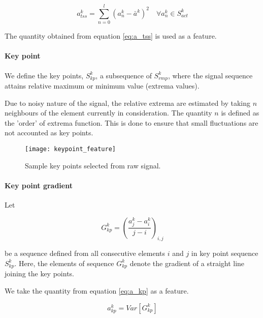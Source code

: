 \documentclass[
10pt,           %
a4paper,        %
oneside,        %
headinclude,footinclude, %
]{scrartcl}
\begin{document}
\begin{equation} \label{eq:a_tss}
a_{tss}^k = \sum_{n=0}^{l}(a^k_n - \bar{a}^k)^2 \quad \forall a^k_n \in S^k_{act}
\end{equation}

The quantity obtained from equation \ref{eq:a_tss} is used as a feature.

\paragraph{Key point}

We define the key points, $S^k_{kp}$, a subsequence of $S^k_{rmp}$, where the signal sequence attains relative maximum or minimum value (extrema values).

Due to noisy nature of the signal, the relative extrema are estimated by taking $n$ neighbours of the element currently in consideration. The quantity $n$ is defined as the 'order' of extrema function. This is done to ensure that small fluctuations are not accounted as key points.

\begin{figure}[h]
  \begin{center}
    \texttt{[image: keypoint\_feature]}
  \end{center}
  \vspace{-10pt}
  \caption{\label{keypoint_feature}Sample key points selected from raw signal.}
  \vspace{-10pt}
\end{figure}

\paragraph{Key point gradient}
Let

\begin{equation} \label{eq:gk_kp}
G^k_{kp} = (\frac{a^k_j-a^k_i}{j-i})_{i,j}
\end{equation}


be a sequence defined from all consecutive elements $i$ and $j$ in key point sequence $S^k_{kp}$. Here, the elements of sequence $G^k_{kp}$ denote the gradient of a straight line joining the key points.

We take the quantity from equation \ref{eq:a_kp} as a feature.

\begin{equation} \label{eq:a_kp}
a_{kp}^k = Var[G^k_{kp}]
\end{equation}
\end{document}
